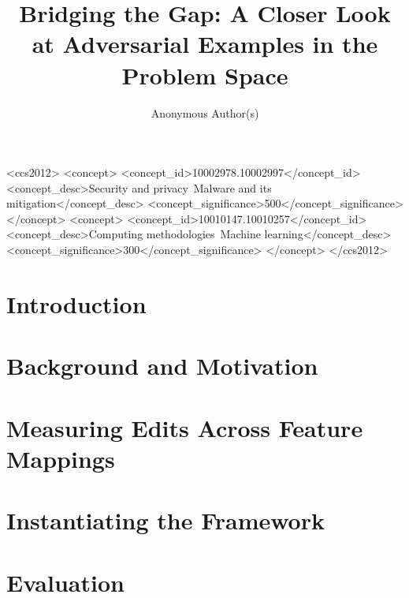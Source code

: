 \documentclass[sigconf,anonymous,acmthm=false]{acmart}
\begin{document}
\title{Bridging the Gap: A Closer Look at Adversarial Examples in the Problem Space}
\author{Anonymous Author(s)}  %

\begin{abstract}

\end{abstract}

\begin{CCSXML}
<ccs2012>
<concept>
<concept_id>10002978.10002997</concept_id>
<concept_desc>Security and privacy~Malware and its mitigation</concept_desc>
<concept_significance>500</concept_significance>
</concept>
<concept>
<concept_id>10010147.10010257</concept_id>
<concept_desc>Computing methodologies~Machine learning</concept_desc>
<concept_significance>300</concept_significance>
</concept>
</ccs2012>
\end{CCSXML}

\maketitle

\section{Introduction}
\label{sec:introduction}


\section{Background and Motivation}
\label{sec:background}


\section{Measuring Edits Across Feature Mappings}
\label{sec:framework}


\section{Instantiating the Framework}
\label{sec:instances}


\section{Evaluation}
\label{sec:evaluation}

\end{document}
